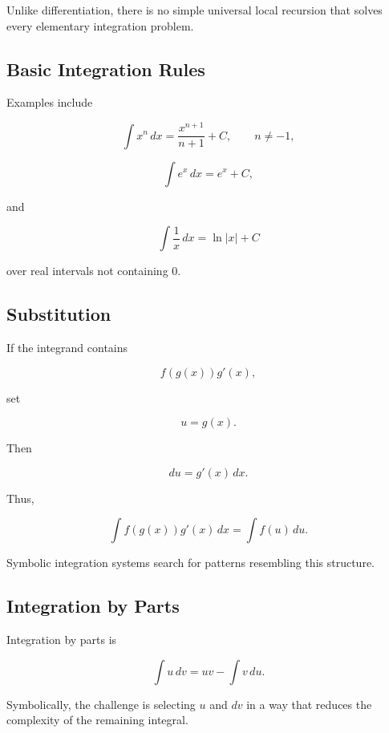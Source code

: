 Unlike differentiation, there is no simple universal local recursion that
solves every elementary integration problem.

\subsection{Basic Integration Rules}
\label{subsec:symbolic-integration-rules}

Examples include

\[
\boxed{
\int x^n\,dx
=
\frac{
x^{n+1}
}{
n+1
}
+
C,
\qquad
n\neq-1,
}
\]

\[
\boxed{
\int e^x\,dx
=
e^x+C,
}
\]

and

\[
\boxed{
\int \frac1x\,dx
=
\ln|x|+C
}
\]

over real intervals not containing \(0\).

\subsection{Substitution}
\label{subsec:symbolic-substitution-integration}

If the integrand contains

\[
f(g(x))g'(x),
\]

set

\[
u=g(x).
\]

Then

\[
du=g'(x)\,dx.
\]

Thus,

\[
\boxed{
\int
f(g(x))g'(x)\,dx
=
\int
f(u)\,du.
}
\]

Symbolic integration systems search for patterns resembling this structure.

\subsection{Integration by Parts}
\label{subsec:symbolic-integration-by-parts}

Integration by parts is

\[
\boxed{
\int u\,dv
=
uv
-
\int v\,du.
}
\]

Symbolically, the challenge is selecting \(u\) and \(dv\) in a way that
reduces the complexity of the remaining integral.

